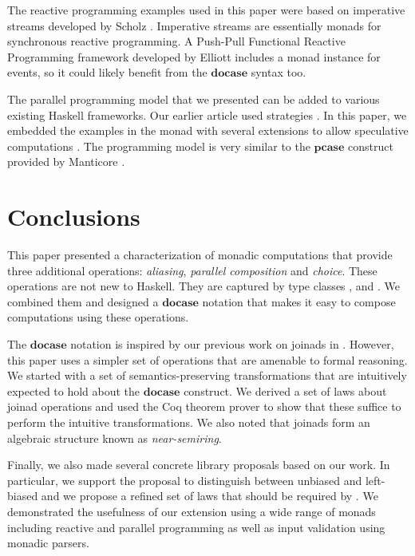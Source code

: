 \documentclass{sigplanconf}
\begin{document}
The reactive programming examples used in this paper were based on imperative streams developed by 
Scholz \cite{imperative-streams}. Imperative streams are essentially monads for synchronous 
reactive programming. A Push-Pull Functional Reactive Programming framework developed by Elliott 
\cite{push-pull-frp} includes a monad instance for events, so it could likely benefit from the
\ensuremath{\mathbf{docase}} syntax too.

The parallel programming model that we presented can be added to various existing Haskell frameworks.
Our earlier article \cite{parcomprefun} used strategies \cite{strategies-new}. In this paper,
we embedded the examples in the  monad \cite{parmonad} with several extensions to
allow speculative computations \cite{parmonad-cancellation}. The programming model is very
similar to the \ensuremath{\mathbf{pcase}} construct provided by Manticore \cite{manticore}.


\section{Conclusions}
This paper presented a characterization of monadic computations that provide three additional 
operations: \textit{aliasing}, \textit{parallel composition} and \textit{choice}. 
These operations are not new to Haskell. They are captured by type classes , 
 and . We combined them and designed a \ensuremath{\mathbf{docase}} notation that makes 
it easy to compose computations using these operations.

The \ensuremath{\mathbf{docase}} notation is inspired by our previous work on joinads in \fsharp. However, this paper
uses a simpler set of operations that are amenable to formal reasoning. We started with a set of 
semantics-preserving transformations that are intuitively expected to hold about the \ensuremath{\mathbf{docase}} construct. We 
derived a set of laws about joinad operations and used the Coq theorem prover to show that these 
suffice to perform the intuitive transformations. We also noted that joinads form an algebraic 
structure known as \textit{near-semiring}.

Finally, we also made several concrete library proposals based on our work. In particular, we support
the proposal to distinguish between unbiased  and left-biased  and we
propose a refined set of laws that should be required by . We demonstrated the
usefulness of our extension using a wide range of monads including reactive and parallel programming
as well as input validation using monadic parsers. 
\end{document}

